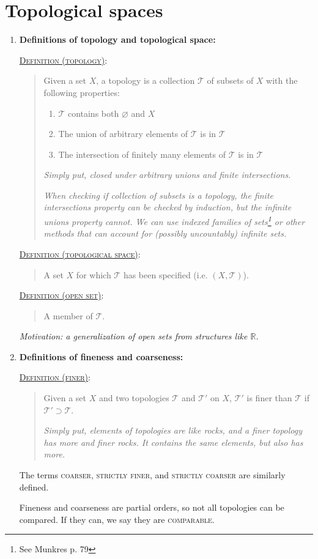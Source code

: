 \documentclass[letterpaper, 12pt]{book}
\newcommand{\RR}{\mathbb{R}}
\newcommand{\ms}[1]{\mathscr{#1}}
\newcommand{\defn}[2]{\textsc{\underline{Definition (#1)}:}\begin{quote} #2\end{quote}}
\let\emptyset\varnothing
\begin{document}
\section{Topological spaces}
    \begin{enumerate}
    \item \textbf{Definitions of topology and topological space:}

        \defn{topology}{Given a set $X$, a topology is a collection $\ms{T}$ of subsets of $X$ with the following properties:
        \begin{enumerate}
            \item $\ms{T}$ contains both $\emptyset$ and $X$
            \item The union of arbitrary elements of $\ms{T}$ is in $\ms{T}$
            \item The intersection of finitely many elements of $\ms{T}$ is in $\ms{T}$
        \end{enumerate}
        \textit{Simply put, closed under arbitrary unions and finite intersections.}

        \textit{When checking if collection of subsets is a topology, the finite intersections property can be checked by induction, but the infinite unions property cannot. We can use indexed families of sets\footnote{See Munkres p. 79} or other methods that can account for (possibly uncountably) infinite sets.}
        }
        \defn{topological space}{A set $X$ for which $\ms{T}$ has been specified (i.e. $(X, \ms{T})$).}
        \defn{open set}{A member of $\ms{T}$.}
        \textit{Motivation: a generalization of open sets from structures like $\RR$.}
    \item \textbf{Definitions of fineness and coarseness:}

        \defn{finer}{Given a set $X$ and two topologies $\ms{T}$ and $\ms{T'}$ on $X$, $\ms{T'}$ is finer than $\ms{T}$ if $\ms{T'}\supset\ms{T}$.\par\textit{Simply put, elements of topologies are like rocks, and a finer topology has more and finer rocks. It contains the same elements, but also has more.}}
        The terms \textsc{coarser}, \textsc{strictly finer}, and \textsc{strictly coarser} are similarly defined.

        Fineness and coarseness are partial orders, so not all topologies can be compared. If they can, we say they are \textsc{comparable}.
    \end{enumerate}
\end{document}
